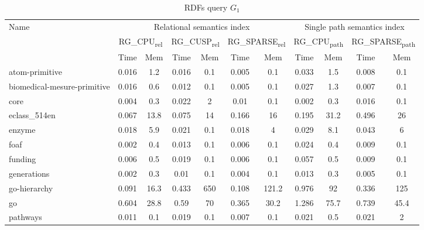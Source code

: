 {\setlength{\tabcolsep}{0.4em}
\begin{table}[h]
\caption{RDFs query $G_1$}
\label{tbl:tableRDFQ1}
\begin{tabular}{| l | c  c | c  c | c  c | c  c | c  c |}
    \hline

    \multirow{3}{*}{Name}   &   \multicolumn{6}{|c|}{Relational semantics index}	&	\multicolumn{4}{|c|}{Single path semantics index} \\
    \cline{2-11}
    	    &	\multicolumn{2}{|c|}{RG\_CPU\textsubscript{rel}}	&	\multicolumn{2}{|c|}{RG\_CUSP\textsubscript{rel}}	&	\multicolumn{2}{|c|}{RG\_SPARSE\textsubscript{rel}} &	\multicolumn{2}{|c|}{RG\_CPU\textsubscript{path}}	&	\multicolumn{2}{|c|}{RG\_SPARSE\textsubscript{path}}	 \\
    \cline{2-11}
            &   Time & Mem &  Time     & Mem & Time     & Mem  &  Time     & Mem & Time     & Mem \\
    \hline
    \hline
    atom-primitive              & 0.016 & 1.2  & 0.016 & 0.1 & 0.005 & 0.1  & 0.033 & 1.5  & 0.008 & 0.1  \\
biomedical-mesure-primitive & 0.016 & 0.6  & 0.012 & 0.1 & 0.005 & 0.1      & 0.027 & 1.3  & 0.007 & 0.1  \\
core                        & 0.004 & 0.3  & 0.022 & 2   & 0.01  & 0.1      & 0.002 & 0.3  & 0.016 & 0.1  \\
eclass\_514en                 & 0.067 & 13.8 & 0.075 & 14  & 0.166 & 16     & 0.195 & 31.2 & 0.496 & 26   \\
enzyme                      & 0.018 & 5.9  & 0.021 & 0.1 & 0.018 & 4        & 0.029 & 8.1  & 0.043 & 6    \\
foaf                        & 0.002 & 0.4  & 0.013 & 0.1 & 0.006 & 0.1      & 0.024 & 0.4  & 0.009 & 0.1  \\
funding                     & 0.006 & 0.5  & 0.019 & 0.1 & 0.006 & 0.1      & 0.057 & 0.5  & 0.009 & 0.1  \\
generations                 & 0.002 & 0.3  & 0.01  & 0.1 & 0.004 & 0.1      & 0.013 & 0.3  & 0.005 & 0.1  \\
go-hierarchy                & 0.091 & 16.3 & 0.433 & 650 & 0.108 & 121.2    & 0.976 & 92   & 0.336 & 125  \\
go                          & 0.604 & 28.8 & 0.59  & 70  & 0.365 & 30.2     & 1.286 & 75.7 & 0.739 & 45.4 \\
pathways                    & 0.011 & 0.1  & 0.019 & 0.1 & 0.007 & 0.1      & 0.021 & 0.5  & 0.021 & 2    \\

\end{tabular}
\end{table}}

